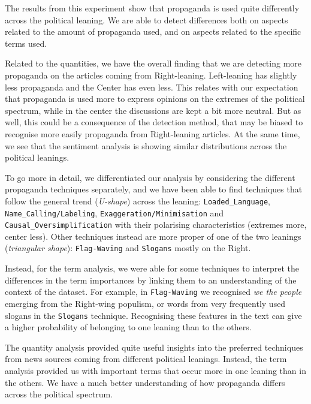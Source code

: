 The results from this experiment show that propaganda is used quite differently across the political leaning.
We are able to detect
differences both on aspects related to the amount of propaganda used, and on aspects related to the specific terms used.

Related to the quantities, we have the overall finding that we are detecting more propaganda on the articles coming from Right-leaning.
Left-leaning has slightly less propaganda and the Center has even less.
This relates with our expectation that propaganda is used more to express opinions on the extremes of the political spectrum, while in the center the discussions are kept a bit more neutral.
But as well, this could be a consequence of the detection method, that may be biased to recognise more easily propaganda from Right-leaning articles.
At the same time, we see that the sentiment analysis is showing similar distributions across the political leanings.

To go more in detail, we differentiated our analysis by considering the different propaganda techniques separately, and we have been able to find techniques that follow the general trend (\emph{U-shape}) across the leaning: \texttt{Loaded\_Language}, \texttt{Name\_Calling/Labeling}, \texttt{Exaggeration/Minimisation} and \texttt{Causal\_Oversimplification} with their polarising characteristics (extremes more, center less). Other techniques instead are more proper of one of the two leanings (\emph{triangular shape}): \texttt{Flag-Waving} and \texttt{Slogans} mostly on the Right.


Instead, for the term analysis, we were able for some techniques to interpret the differences in the term importances by linking them to an understanding of the context of the dataset. For example, in \texttt{Flag-Waving} we recognised \textit{we the people} emerging from the Right-wing populism, or words from very frequently used slogans in the \texttt{Slogans} technique.
Recognising these features in the text can give a higher probability of belonging to one leaning than to the others.

The quantity analysis provided quite useful insights into the preferred techniques from news sources coming from different political leanings. Instead, the term analysis provided us with important terms that occur more in one leaning than in the others.
We have a much better understanding of how propaganda differs across the political spectrum.

